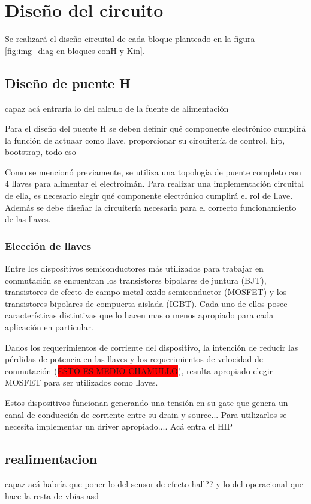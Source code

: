 \section{Diseño del circuito}

Se realizará el diseño circuital de cada bloque planteado en la figura \ref{fig:img_diag-en-bloques-conH-y-Kin}.

\subsection{Diseño de puente H}

capaz acá entraría lo del calculo de la fuente de alimentación

Para el diseño del puente H se deben definir qué componente electrónico cumplirá la función de actuaar como llave, proporcionar su circuitería de control, hip, bootstrap, todo eso

Como se mencionó previamente, se utiliza una topología de puente completo con 4 llaves para alimentar el electroimán. Para realizar una implementación circuital de ella, es necesario elegir qué componente electrónico cumplirá el rol de llave. Además se debe diseñar la circuitería necesaria para el correcto funcionamiento de las llaves.

\subsubsection{Elección de llaves}

Entre los dispositivos semiconductores más utilizados para trabajar en conmutación se encuentran los transistores bipolares de juntura (BJT), transistores de efecto de campo metal-oxido semiconductor (MOSFET) y los transistores bipolares de compuerta aislada (IGBT). Cada uno de ellos posee características distintivas que lo hacen mas o menos apropiado para cada aplicación en particular.

Dados los requerimientos de corriente del dispositivo, la intención de reducir las pérdidas de potencia en las llaves y los requerimientos de velocidad de conmutación (\colorbox{red}{ESTO ES MEDIO CHAMULLO}), resulta apropiado elegir MOSFET para ser utilizados como llaves. 

Estos dispositivos funcionan generando una tensión en su gate que genera un canal de conducción de corriente entre su drain y source... Para utilizarlos se necesita implementar un driver apropiado.... Acá entra el HIP


\subsection{realimentacion}
capaz acá habría que poner lo del sensor de efecto hall?? y lo del operacional que hace la resta de vbias
asd


